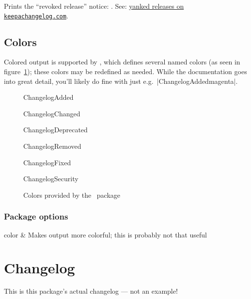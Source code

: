 \documentclass{ltxdoc}
\begin{document}
\begin{macro}{\changelogyanked} Prints the ``revoked release'' notice:
\changelogyanked. See:
\href{https://keepachangelog.com/en/1.0.0/#yanked}{yanked releases on
\texttt{keepachangelog.com}}.

\end{macro}

\subsection{Colors}%
\label{sec:colors}

Colored output is supported by , which defines several named
colors (as seen in figure~\ref{fig:colors}); these colors may be redefined
as needed. While the  documentation goes into great detail,
you'll likely do fine with just e.g.\ |{ChangelogAdded}{magenta}|.

\begin{figure}[h]
	\centering
	\begin{adjustwidth}{1in}{1in}
	\begin{colorlist}
		\item{ChangelogAdded}
		\item{ChangelogChanged}
		\item{ChangelogDeprecated}
		\item{ChangelogRemoved}
		\item{ChangelogFixed}
		\item{ChangelogSecurity}
	\end{colorlist}
	\end{adjustwidth}
	\caption{Colors provided by the \cl\ package}
	\label{fig:colors}
\end{figure}

\subsubsection{Package options}

\begin{Optionlist}
	color & Makes output more colorful; this is probably not that useful
\end{Optionlist}

\section{Changelog}

This is this package's actual changelog --- not an example!
\end{document}
